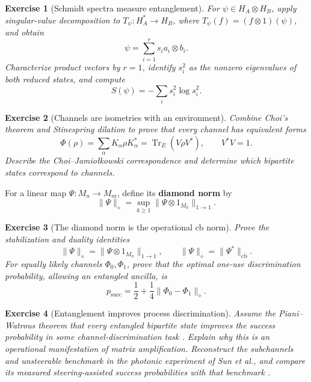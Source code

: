 \documentclass{article}
\newtheorem{exercise}{Exercise}
\begin{document}
\begin{exercise}[Schmidt spectra measure entanglement]
\leavevmode\par
\textit{For $\psi\in H_A\otimes H_B$, apply singular-value decomposition to
$T_\psi:H_A^*\to H_B$, where $T_\psi(f)=(f\otimes1)(\psi)$, and obtain}
\[
\psi=\sum_{i=1}^r s_i a_i\otimes b_i.
\]
\textit{Characterize product vectors by $r=1$, identify $s_i^2$ as the
nonzero eigenvalues of both reduced states, and compute}
\[
S(\psi)=-\sum_i s_i^2\log s_i^2.
\]
\end{exercise}

\begin{exercise}[Channels are isometries with an environment]\leavevmode\par
\textit{Combine Choi's theorem and Stinespring dilation to prove that every
channel has equivalent forms}
\[
\Phi(\rho)=\sum_\alpha K_\alpha\rho K_\alpha^*
=\operatorname{Tr}_E(V\rho V^*),
\qquad
V^*V=1.
\]
\textit{Describe the Choi--Jamio{\l}kowski correspondence and determine
which bipartite states correspond to channels.}
\end{exercise}

For a linear map $\Psi:M_n\to M_m$, define its \textbf{diamond norm} by
\[
\|\Psi\|_\diamond
=\sup_{k\geq1}\|\Psi\otimes1_{M_k}\|_{1\to1}.
\]

\begin{exercise}[The diamond norm is the operational cb norm]
\leavevmode\par
\textit{Prove the stabilization and duality identities}
\cite{watrous-cb-norms}
\[
\|\Psi\|_\diamond
=\|\Psi\otimes1_{M_n}\|_{1\to1},
\qquad
\|\Psi\|_\diamond=\|\Psi^*\|_{\mathrm{cb}}.
\]
\textit{For equally likely channels $\Phi_0,\Phi_1$, prove that the optimal
one-use discrimination probability, allowing an entangled ancilla, is}
\[
p_{\mathrm{succ}}
=\frac12+\frac14\|\Phi_0-\Phi_1\|_\diamond.
\]
\end{exercise}

\begin{exercise}[Entanglement improves process discrimination]
\leavevmode\par
\textit{Assume the Piani--Watrous theorem that every entangled bipartite
state improves the success probability in some channel-discrimination task
\cite{piani-watrous}. Explain why this is an operational manifestation of
matrix amplification. Reconstruct the subchannels and unsteerable benchmark
in the photonic experiment of Sun et al., and compare its measured
steering-assisted success probabilities with that benchmark
\cite{sun-subchannel}.}
\end{exercise}
\end{document}
